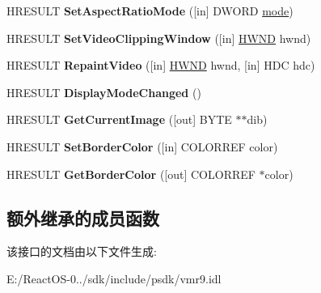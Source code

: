 \begin{DoxyCompactItemize}
\item 
\mbox{\label{interface_i_v_m_r_windowless_control9_a14e309dc367a26f4e8f4f1180bccf052}} 
H\+R\+E\+S\+U\+LT {\bfseries Set\+Aspect\+Ratio\+Mode} (\mbox{[}in\mbox{]} D\+W\+O\+RD \hyperlink{interfacevoid}{mode})
\item 
\mbox{\label{interface_i_v_m_r_windowless_control9_af3104f7a12ee67c2152ae1a99d5cdecc}} 
H\+R\+E\+S\+U\+LT {\bfseries Set\+Video\+Clipping\+Window} (\mbox{[}in\mbox{]} \hyperlink{interfacevoid}{H\+W\+ND} hwnd)
\item 
\mbox{\label{interface_i_v_m_r_windowless_control9_a15b158f6d2a2e2fc2fa72f11dbdd493a}} 
H\+R\+E\+S\+U\+LT {\bfseries Repaint\+Video} (\mbox{[}in\mbox{]} \hyperlink{interfacevoid}{H\+W\+ND} hwnd, \mbox{[}in\mbox{]} H\+DC hdc)
\item 
\mbox{\label{interface_i_v_m_r_windowless_control9_a49e032b5d4f916eab7b7fb5149028818}} 
H\+R\+E\+S\+U\+LT {\bfseries Display\+Mode\+Changed} ()
\item 
\mbox{\label{interface_i_v_m_r_windowless_control9_a12c0744649f685e89cddb2c51ee284ac}} 
H\+R\+E\+S\+U\+LT {\bfseries Get\+Current\+Image} (\mbox{[}out\mbox{]} B\+Y\+TE $\ast$$\ast$dib)
\item 
\mbox{\label{interface_i_v_m_r_windowless_control9_a0cc8c01adaae7a68100d0decc4b66534}} 
H\+R\+E\+S\+U\+LT {\bfseries Set\+Border\+Color} (\mbox{[}in\mbox{]} C\+O\+L\+O\+R\+R\+EF color)
\item 
\mbox{\label{interface_i_v_m_r_windowless_control9_af34ab8d2954bd9a30d8e4a7287ca65a8}} 
H\+R\+E\+S\+U\+LT {\bfseries Get\+Border\+Color} (\mbox{[}out\mbox{]} C\+O\+L\+O\+R\+R\+EF $\ast$color)
\end{DoxyCompactItemize}
\subsection*{额外继承的成员函数}


该接口的文档由以下文件生成\+:\begin{DoxyCompactItemize}
\item 
E\+:/\+React\+O\+S-\/0../sdk/include/psdk/vmr9.\+idl\end{DoxyCompactItemize}
